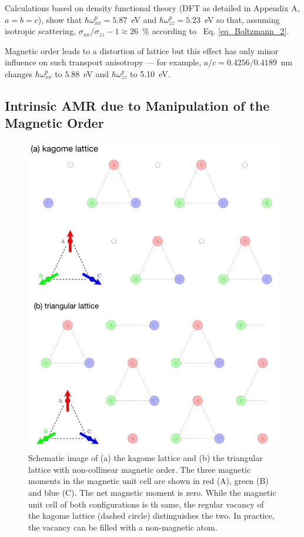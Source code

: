 \documentclass[prb,showpacs,amsmath,amssymb,superscriptaddress,twocolumn,floatfix]{revtex4-1}
\begin{document}
Calculations based on density functional theory (DFT as detailed in Appendix A, $a=b=c$), show that $\hbar\omega^p_{xx}=5.87$~eV and $\hbar\omega^p_{zz}=5.23$~eV so that, assuming isotropic scattering, $\sigma_{xx}/\sigma_{zz}-1\approx 26$~\% according to~ Eq. \ref{eq_Boltzmann_2}.

Magnetic order leads to a distortion of lattice but this effect has only minor influence on such transport anisotropy --- for example, $a/c=0.4256/0.4189$~nm changes $\hbar\omega^p_{xx}$ to $5.88$~eV and $\hbar\omega^p_{zz}$ to 5.10~eV.

\subsection{Intrinsic AMR due to Manipulation of the Magnetic Order}
\label{sec_I_Kagome}

\begin{figure}[h!]
	\centering
	\includegraphics[width=1\linewidth]{img/kagome_triangular_11.jpg}
	\caption{Schematic image of (a) the kagome lattice and (b) the triangular lattice with non-collinear magnetic order. The three magnetic moments in the magnetic unit cell are shown in red (A), green (B) and blue (C). The net magnetic moment is zero. While the magnetic unit cell of both configurations is th same, the regular vacancy of the kagome lattice (dashed circle) distinguishes the two. In practice, the vacancy can be filled with a non-magnetic atom.}
	\label{fig:kagome_triangular}
\end{figure}
\end{document}
